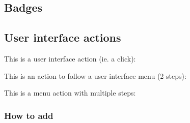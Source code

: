 
\subsection{Badges}\label{badges}

\begin{Shaded}
\begin{Highlighting}[]
\end{Highlighting}
\end{Shaded}

\subsection{User interface actions}\label{user-interface-actions}

This is a user interface action (ie. a click):

\begin{Shaded}
\begin{Highlighting}[]
\end{Highlighting}
\end{Shaded}

This is an action to follow a user interface menu (2 steps):

\begin{Shaded}
\begin{Highlighting}[]
\end{Highlighting}
\end{Shaded}

This is a menu action with multiple steps:

\begin{Shaded}
\begin{Highlighting}[]
\end{Highlighting}
\end{Shaded}

\subsubsection{How to add}\label{how-to-add}

